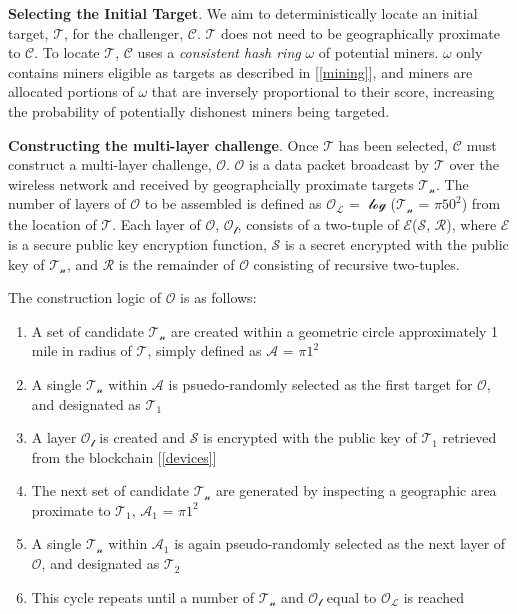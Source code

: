 \documentclass[letterpaper,11pt]{article}
\begin{document}
\textbf{Selecting the Initial Target}. We aim to deterministically locate an initial target, $\mathcal{T}$, for the challenger, $\mathcal{C}$. $\mathcal{T}$ does not need to be geographically proximate to $\mathcal{C}$. To locate $\mathcal{T}$, $\mathcal{C}$ uses a \textit{consistent hash ring} $\mathcal{\omega}$ of potential miners. $\mathcal{\omega}$ only contains miners eligible as targets as described in [\ref{mining}], and miners are allocated portions of $\mathcal{\omega}$ that are inversely proportional to their score, increasing the probability of potentially dishonest miners being targeted.\newline

\textbf{Constructing the multi-layer challenge}. Once $\mathcal{T}$ has been selected, $\mathcal{C}$ must construct a multi-layer challenge, $\mathcal{O}$. $\mathcal{O}$ is a data packet broadcast by $\mathcal{T}$ over the wireless network and received by geographcially proximate targets $\mathcal{T_n}$. The number of layers of $\mathcal{O}$ to be assembled is defined as $\mathcal{O_L}$ = $\mathcal{\log}$($\mathcal{T_n}$ = $\mathcal{\pi}$$\mathcal{50^2}$) from the location of $\mathcal{T}$. Each layer of $\mathcal{O}$, $\mathcal{O_l}$, consists of a two-tuple of $\mathcal{E}$($\mathcal{S}$, $\mathcal{R}$), where $\mathcal{E}$ is a secure public key encryption function, $\mathcal{S}$ is a secret encrypted with the public key of $\mathcal{T_n}$, and $\mathcal{R}$ is the remainder of $\mathcal{O}$ consisting of recursive two-tuples.\newline

The construction logic of $\mathcal{O}$ is as follows:

\begin{enumerate}
  \item A set of candidate $\mathcal{T_n}$ are created within a geometric circle approximately 1 mile in radius of $\mathcal{T}$, simply defined as $\mathcal{A}$ = $\mathcal{\pi}$$\mathcal{1^2}$
  \item A single $\mathcal{T_n}$ within $\mathcal{A}$ is psuedo-randomly selected as the first target for $\mathcal{O}$, and designated as $\mathcal{T_1}$
  \item A layer $\mathcal{O_l}$ is created and $\mathcal{S}$ is encrypted with the public key of $\mathcal{T_1}$ retrieved from the blockchain [\ref{devices}]
  \item The next set of candidate $\mathcal{T_n}$ are generated by inspecting a geographic area proximate to $\mathcal{T_1}$, $\mathcal{A_1}$ = $\mathcal{\pi}$$\mathcal{1^2}$
  \item A single $\mathcal{T_n}$ within $\mathcal{A_1}$ is again pseudo-randomly selected as the next layer of $\mathcal{O}$, and designated as $\mathcal{T_2}$
  \item This cycle repeats until a number of $\mathcal{T_n}$ and $\mathcal{O_l}$ equal to $\mathcal{O_L}$ is reached
\end{enumerate}
\end{document}
